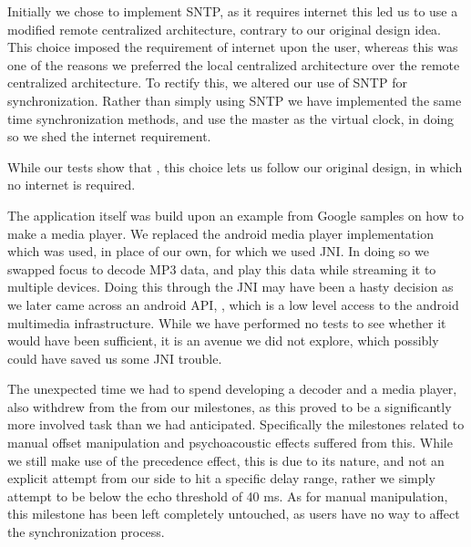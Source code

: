 Initially we chose to implement \ac{SNTP}, as it requires internet this led us to use a modified remote centralized architecture, contrary to our original design idea.
This choice imposed the requirement of internet upon the user, whereas this was one of the reasons we preferred the local centralized architecture over the remote centralized architecture.
To rectify this, we altered our use of \ac{SNTP} for synchronization.
Rather than simply using \ac{SNTP} we have implemented the same time synchronization methods, and use the master as the virtual clock, in doing so we shed the internet requirement.

While our tests show that , this choice lets us follow our original design, in which no internet is required.

\bigskip
The application itself was build upon an example from Google samples on how to make a media player.
We replaced the android media player implementation which was used, in place of our own, for which we used \ac{JNI}.
In doing so we swapped focus to decode MP3 data, and play this data while streaming it to multiple devices.
Doing this through the \ac{JNI} may have been a hasty decision as we later came across an android API, , which is a low level access to the android multimedia infrastructure.
While we have performed no tests to see whether it would have been sufficient, it is an avenue we did not explore, which possibly could have saved us some \ac{JNI} trouble.

The unexpected time we had to spend developing a decoder and a media player, also withdrew from the from our milestones, as this proved to be a significantly more involved task than we had anticipated.
Specifically the milestones related to manual offset manipulation and psychoacoustic effects suffered from this.
While we still make use of the precedence effect, this is due to its nature, and not an explicit attempt from our side to hit a specific delay range, rather we simply attempt to be below the echo threshold of 40 ms.
As for manual manipulation, this milestone has been left completely untouched, as users have no way to affect the synchronization process.

